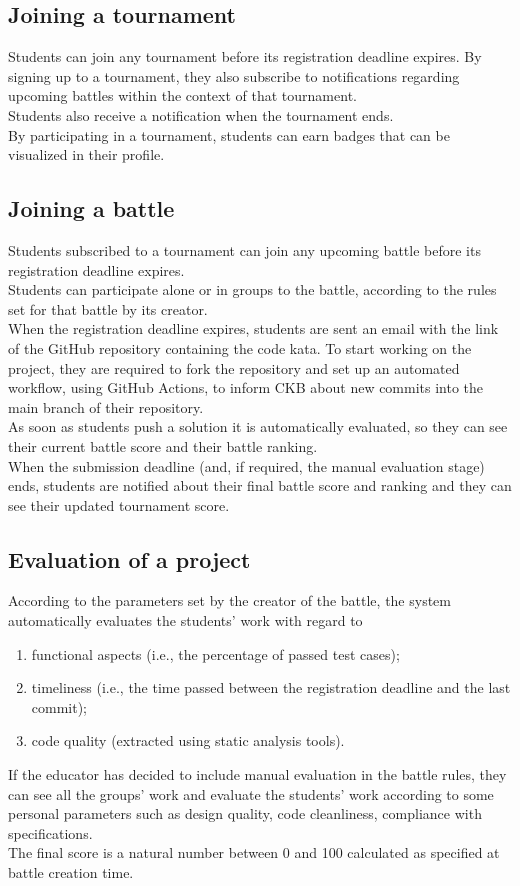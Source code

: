 \subsection{Joining a tournament}
Students can join any tournament before its registration deadline expires. By signing up to a tournament, they also 
subscribe to notifications regarding upcoming battles within the context of that tournament.\\
Students also receive a notification when the tournament ends.\\
By participating in a tournament, students can earn badges that can be visualized in their profile.\\

\subsection{Joining a battle}
Students subscribed to a tournament can join any upcoming battle before its registration deadline expires.\\
Students can participate alone or in groups to the battle, according to the rules set for that battle by its creator.\\
When the registration deadline expires, students are sent an email with the link of the GitHub repository containing the 
code kata. To start working on the project, they are required to fork the repository and set up an automated workflow, 
using GitHub Actions, to inform CKB about new commits into the main branch of their repository.\\
As soon as students push a solution it is automatically evaluated, so they can see their current battle score and their 
battle ranking.\\
When the submission deadline (and, if required, the manual evaluation stage) ends, students are notified about their final 
battle score and ranking and they can see their updated tournament score.\\

\subsection{Evaluation of a project}
According to the parameters set by the creator of the battle, the system automatically evaluates the students' work with regard to
\begin{enumerate}
  \item functional aspects (i.e., the percentage of passed test cases);
  \item timeliness (i.e., the time passed between the registration deadline and the last commit);
  \item code quality (extracted using static analysis tools).
\end{enumerate}
If the educator has decided to include manual evaluation in the battle rules, they can see all the groups' work and evaluate 
the students' work according to some personal parameters such as design quality, code cleanliness, compliance with specifications.\\
The final score is a natural number between 0 and 100 calculated as specified at battle creation time.\\

